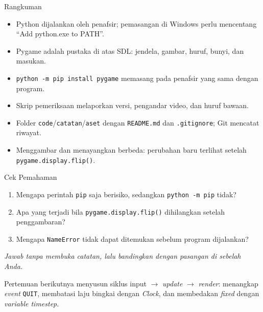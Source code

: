 \documentclass[aspectratio=169,10pt]{beamer}
\begin{document}
\begin{frame}{Rangkuman}
\begin{itemize}
  \item Python dijalankan oleh penafsir; pemasangan di Windows perlu mencentang
        ``Add python.exe to PATH''.
  \item Pygame adalah pustaka di atas SDL: jendela, gambar, huruf, bunyi, dan
        masukan.
  \item \texttt{python -m pip install pygame} memasang pada penafsir yang sama
        dengan program.
  \item Skrip pemeriksaan melaporkan versi, pengandar video, dan huruf bawaan.
  \item Folder \texttt{code}/\texttt{catatan}/\texttt{aset} dengan
        \texttt{README.md} dan \texttt{.gitignore}; Git mencatat riwayat.
  \item Menggambar dan menayangkan berbeda: perubahan baru terlihat setelah
        \texttt{pygame.display.flip()}.
\end{itemize}
\end{frame}

\begin{frame}{Cek Pemahaman}
\begin{enumerate}
  \item Mengapa perintah \texttt{pip} saja berisiko, sedangkan
        \texttt{python -m pip} tidak?
  \item Apa yang terjadi bila \texttt{pygame.display.flip()} dihilangkan setelah
        penggambaran?
  \item Mengapa \texttt{NameError} tidak dapat ditemukan sebelum program
        dijalankan?
\end{enumerate}
\vspace{0.35cm}
{\footnotesize\color{ubMuted}\itshape Jawab tanpa membuka catatan, lalu
bandingkan dengan pasangan di sebelah Anda.}
\end{frame}

  {Pertemuan berikutnya menyusun siklus input $\rightarrow$ \emph{update}
   $\rightarrow$ \emph{render}: menangkap \emph{event} \texttt{QUIT},
   membatasi laju bingkai dengan \emph{Clock}, dan membedakan \emph{fixed}
   dengan \emph{variable timestep}.}
\end{document}
